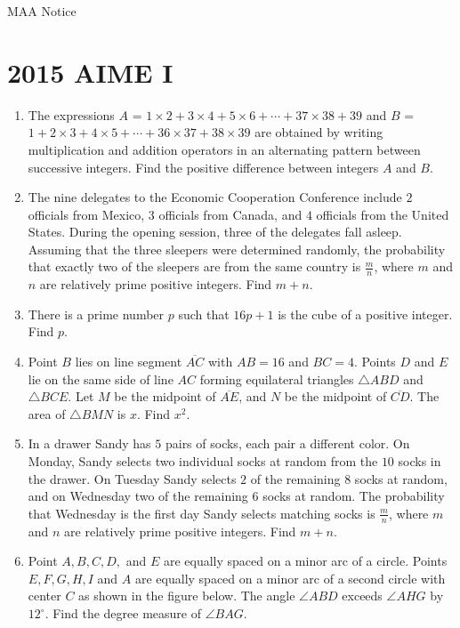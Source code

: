 \documentclass{article}
\begin{document}
\begin{enumerate}[label=\arabic*., itemsep=0.5em]
{{MAA Notice}}\par \vspace{0.5em}\end{enumerate}\newpage\section*{2015 AIME I}\begin{enumerate}[label=\arabic*., itemsep=0.5em]\item The expressions $A$ = $ 1 \times 2 + 3 \times 4 + 5 \times 6 + \cdots + 37 \times 38 + 39 $ and $B$ = $ 1 + 2 \times 3 + 4 \times 5 + \cdots + 36 \times 37 + 38 \times 39 $ are obtained by writing multiplication and addition operators in an alternating pattern between successive integers.  Find the positive difference between integers $A$ and $B$.\par \vspace{0.5em}\item The nine delegates to the Economic Cooperation Conference include $2$ officials from Mexico, $3$ officials from Canada, and $4$ officials from the United States. During the opening session, three of the delegates fall asleep. Assuming that the three sleepers were determined randomly, the probability that exactly two of the sleepers are from the same country is $\frac{m}{n}$, where $m$ and $n$ are relatively prime positive integers. Find $m+n$.\par \vspace{0.5em}\item There is a prime number $p$ such that $16p+1$ is the cube of a positive integer.  Find $p$.\par \vspace{0.5em}\item Point $B$ lies on line segment $\overline{AC}$ with $AB=16$ and $BC=4$. Points $D$ and $E$ lie on the same side of line $AC$ forming equilateral triangles $\triangle ABD$ and $\triangle BCE$. Let $M$ be the midpoint of $\overline{AE}$, and $N$ be the midpoint of $\overline{CD}$. The area of $\triangle BMN$ is $x$. Find $x^2$.\par \vspace{0.5em}\item In a drawer Sandy has $5$ pairs of socks, each pair a different color.  On Monday, Sandy selects two individual socks at random from the $10$ socks in the drawer.  On Tuesday Sandy selects $2$ of the remaining $8$ socks at random, and on Wednesday two of the remaining $6$ socks at random.  The probability that Wednesday is the first day Sandy selects matching socks is $\frac{m}{n}$, where $m$ and $n$ are relatively prime positive integers. Find $m+n$.\par \vspace{0.5em}\item Point $A,B,C,D,$ and $E$ are equally spaced on a minor arc of a circle. Points $E,F,G,H,I$ and $A$ are equally spaced on a minor arc of a second circle with center $C$ as shown in the figure below. The angle $\angle ABD$ exceeds $\angle AHG$ by $12^\circ$. Find the degree measure of $\angle BAG$.



\end{enumerate}
\end{document}
